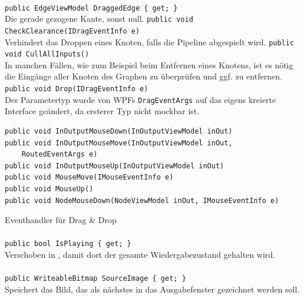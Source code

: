 \paragraph{}
\begin{itemize}
	\add \verb!public EdgeViewModel DraggedEdge { get; }! \\
	Die gerade gezogene Kante, sonst null.
	\add \verb!public void CheckClearance(IDragEventInfo e)! \\
	Verhindert das Droppen eines Knoten, falls die Pipeline abgespielt wird.
	\add \verb!public void CullAllInputs()! \\
	In manchen Fällen, wie zum Beispiel beim Entfernen eines Knotens, ist es nötig die Eingänge aller Knoten des Graphen zu überprüfen und ggf. zu entfernen.
	\change \verb!public void Drop(IDragEventInfo e)! \\
	Der Parametertyp wurde von WPFs \verb!DragEventArgs! auf das eigens kreierte Interface  geändert, da ersterer Typ nicht mockbar ist.
	\add \begin{verbatim}
public void InOutputMouseDown(InOutputViewModel inOut)
public void InOutputMouseMove(InOutputViewModel inOut,
    RoutedEventArgs e)
public void InOutputMouseUp(InOutputViewModel inOut)
public void MouseMove(IMouseEventInfo e)
public void MouseUp()
public void NodeMouseDown(NodeViewModel inOut, IMouseEventInfo e)
	\end{verbatim}
	Eventhandler für Drag \& Drop
\end{itemize}

\paragraph{}
\begin{itemize}
	\remove \verb!public bool IsPlaying { get; }! \\
	Verschoben in , damit dort der gesamte Wiedergabezustand gehalten wird.
\end{itemize}

\paragraph{}
\begin{itemize}
	\add \verb!public WriteableBitmap SourceImage { get; }! \\
	Speichert das Bild, das als nächstes in das Ausgabefenster gezeichnet werden soll.
\end{itemize}
\newpage

